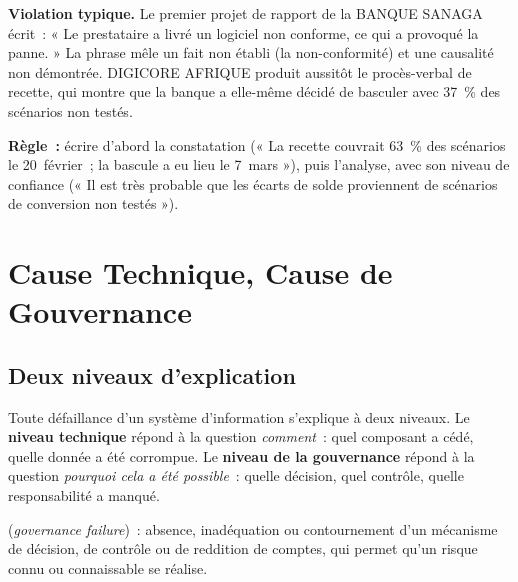 \begin{boxalert}
\textbf{Violation typique.} Le premier projet de rapport de la BANQUE
SANAGA écrit~: « Le prestataire a livré un logiciel non conforme, ce qui a
provoqué la panne. » La phrase mêle un fait non établi (la non-conformité)
et une causalité non démontrée. DIGICORE AFRIQUE produit aussitôt le
procès-verbal de recette, qui montre que la banque a elle-même décidé de
basculer avec 37~\% des scénarios non testés.

\smallskip
\textbf{Règle~:} écrire d'abord la constatation (« La recette couvrait
63~\% des scénarios le 20~février~; la bascule a eu lieu le 7~mars »), puis
l'analyse, avec son niveau de confiance (« Il est très probable que les
écarts de solde proviennent de scénarios de conversion non testés »).
\end{boxalert}

\section{Cause Technique, Cause de Gouvernance}
\label{sec:pro-causes}

\subsection{Deux niveaux d'explication}

Toute défaillance d'un système d'information s'explique à deux niveaux. Le
\textbf{niveau technique} répond à la question \emph{comment}~: quel
composant a cédé, quelle donnée a été corrompue. Le \textbf{niveau de la
gouvernance} répond à la question \emph{pourquoi cela a été possible}~:
quelle décision, quel contrôle, quelle responsabilité a manqué.

\begin{boxdef}
(\textit{governance failure})~: absence, inadéquation ou contournement d'un
mécanisme de décision, de contrôle ou de reddition de comptes, qui permet
qu'un risque connu ou connaissable se réalise.
\end{boxdef}

